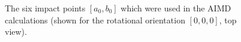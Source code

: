 \documentclass[11pt,DIV=13,BCOR=5mm,a4paper,headinclude]{scrbook}
\begin{document}
\begin{figure}[h!]
        \quad
        \quad
 \caption{The six impact points $[a_0,b_0]$ which were used in the AIMD calculations (shown for the rotational orientation $[0,0,0]$, top view).
}
        \label{abb:impact_points}
 \end{figure}
 
\end{document}
